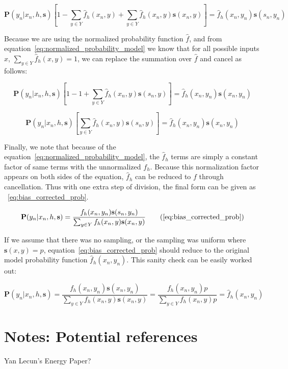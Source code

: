 \documentclass[twoside]{article}
\begin{document}
\begin{appendices}
\[\mathbf{P}(y_n|x_n,h,\mathbf{s})\left [ 1 - \sum_{y \in Y}\hat{f}_h(x_n,y)+\sum_{y \in Y}\hat{f}_h(x_n,y)\mathbf{s}(x_n,y) \right ]=\hat{f}_h(x_n,y_n)\mathbf{s}(s_n,y_n) \]

Because we are using the normalized probability function \(\hat{f}\), and from equation~\eqref{eq:normalized_probability_model} we know that for all possible inputs \(x\), \(\sum_{y \in Y} \hat{f}_h(x, y) = 1\), we can replace the summation over \(\hat{f}\) and cancel as follows:

\[\mathbf{P}(y_n|x_n,h,\mathbf{s})\left [ 1 - 1+\sum_{y \in Y}\hat{f}_h(x_n,y)\mathbf{s}(s_n,y) \right ]=\hat{f}_h(x_n,y_n)\mathbf{s}(x_n,y_n) \]

\[\mathbf{P}(y_n|x_n,h,\mathbf{s})\left [\sum_{y \in Y}\hat{f}_h(x_n,y)\mathbf{s}(s_n,y) \right ]=\hat{f}_h(x_n,y_n)\mathbf{s}(x_n,y_n) \]

Finally, we note that because of the equation~\eqref{eq:normalized_probability_model}, the \(\hat{f}_h\) terms are simply a constant factor of same terms with the unnormalized \(f_h\). Because this normalization factor appears on both sides of the equation, \(\hat{f}_h\) can be reduced to \(f\) through cancellation. Thus with one extra step of division, the final form can be given as ~\eqref{eq:bias_corrected_prob}.

\begin{equation}
\mathbf{P}(y_n|x_n,h,\mathbf{s})=\dfrac{f_h(x_n,y_n)\mathbf{s}(s_n,y_n)}{\sum_{y \in Y}f_h(x_n,y)\mathbf{s}(x_n,y)}
\tag{\ref{eq:bias_corrected_prob}}
\end{equation}

If we assume that there was no sampling, or the sampling was uniform where \(\mathbf{s}(x,y)=p\), equation~\eqref{eq:bias_corrected_prob} should reduce to the original model probability function \(\hat{f}_h(x_n,y_n)\). This sanity check can be easily worked out:

\[\mathbf{P}(y_n|x_n,h,\mathbf{s})=\frac{f_h(x_n,y_n)\mathbf{s}(x_n,y_n)}{\sum_{y \in Y}f_h(x_n,y)\mathbf{s}(x_n,y)}=\frac{f_h(x_n,y_n)p}{\sum_{y \in Y}f_h(x_n,y)p} =\hat{f}_h(x_n,y_n)\]

\end{appendices}

\section{Notes: Potential references}

Yan Lecun’s Energy Paper?
\end{document}

